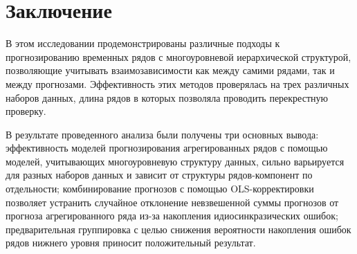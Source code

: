 \documentclass[12pt,a4paper, oneside]{extreport}
\begin{document}
%
%



\chapter*{Заключение}



В этом исследовании продемонстрированы различные подходы к прогнозированию временных рядов с многоуровневой иерархической структурой, позволяющие учитывать взаимозависимости как между самими рядами, так и между  прогнозами.  Эффективность этих методов проверялась на трех различных наборов данных, длина рядов в которых позволяла проводить перекрестную проверку.

В результате проведенного анализа были получены три основных вывода:  эффективность  моделей прогнозирования  агрегированных рядов с помощью моделей, учитывающих многоуровневую структуру данных,  сильно варьируется для разных наборов данных и зависит от структуры рядов-компонент   по отдельности;
комбинирование прогнозов с помощью OLS-корректировки позволяет устранить случайное  отклонение невзвешенной суммы прогнозов от прогноза агрегированного ряда из-за накопления идиосинкразических ошибок;
предварительная группировка с целью снижения вероятности накопления ошибок  рядов нижнего уровня приносит положительный результат. 
\end{document}
